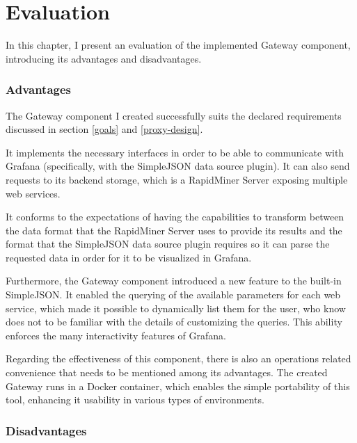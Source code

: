 \chapter{Evaluation}

In this chapter, I present an evaluation of the implemented Gateway component, introducing its advantages and disadvantages.

\subsection{Advantages}

The Gateway component I created successfully suits the declared requirements discussed in section \ref{goals} and \ref{proxy-design}.

It implements the necessary interfaces in order to be able to communicate with Grafana (specifically, with the SimpleJSON data source plugin). It can also send requests to its backend storage, which is a RapidMiner Server exposing multiple web services.

It conforms to the expectations of having the capabilities to transform between the data format that the RapidMiner Server uses to provide its results and the format that the SimpleJSON data source plugin requires so it can parse the requested data in order for it to be visualized in Grafana.

Furthermore, the Gateway component introduced a new feature to the built-in SimpleJSON. It enabled the querying of  the available parameters for each web service, which made it possible to dynamically list them for the user, who know does not to be familiar with the details of customizing the queries. This ability enforces the many interactivity features of Grafana.

Regarding the effectiveness of this component, there is also an operations related convenience that needs to be mentioned among its advantages. The created Gateway runs in a Docker container, which enables the simple portability of this tool, enhancing it usability in various types of environments.

\subsection{Disadvantages} \label{proxy-cons}

